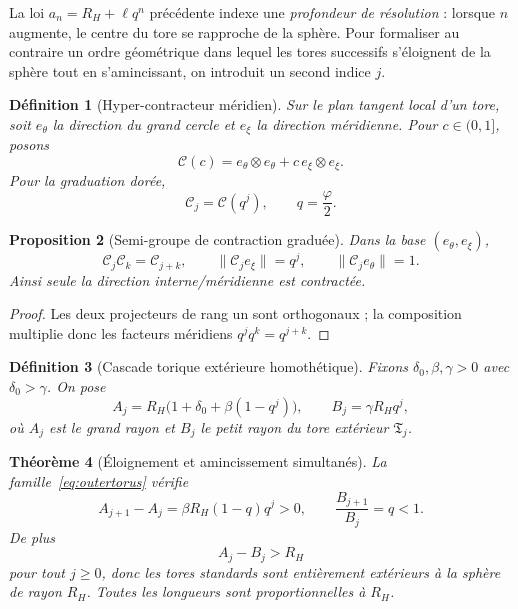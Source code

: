 \documentclass[11pt,a4paper]{article}
\newtheorem{theorem}{Théorème}[section]
\newtheorem{proposition}[theorem]{Proposition}
\newtheorem{definition}[theorem]{Définition}
\newcommand{\ph}{\varphi}
\begin{document}
La loi $a_n=R_H+\ell q^n$ précédente indexe une \emph{profondeur de résolution} : lorsque $n$ augmente, le centre du tore se rapproche de la sphère. Pour formaliser au contraire un ordre géométrique dans lequel les tores successifs s'éloignent de la sphère tout en s'amincissant, on introduit un second indice $j$.

\begin{definition}[Hyper-contracteur méridien]
Sur le plan tangent local d'un tore, soit $e_\theta$ la direction du grand cercle et $e_\xi$ la direction méridienne. Pour $c\in(0,1]$, posons
\[
 \mathcal C(c)=e_\theta\otimes e_\theta+c\,e_\xi\otimes e_\xi.
\]
Pour la graduation dorée,
\begin{equation}\label{eq:Cj}
 \mathcal C_j=\mathcal C(q^j),\qquad q=\frac\ph2.
\end{equation}
\end{definition}

\begin{proposition}[Semi-groupe de contraction graduée]\label{prop:C-semigroup}
Dans la base $(e_\theta,e_\xi)$,
\[
 \mathcal C_j\mathcal C_k=\mathcal C_{j+k},
 \qquad
 \|\mathcal C_j e_\xi\|=q^j,
 \qquad
 \|\mathcal C_j e_\theta\|=1.
\]
Ainsi seule la direction interne/méridienne est contractée.
\end{proposition}

\begin{proof}
Les deux projecteurs de rang un sont orthogonaux ; la composition multiplie donc les facteurs méridiens $q^jq^k=q^{j+k}$.
\end{proof}

\begin{definition}[Cascade torique extérieure homothétique]\label{def:outer-tori}
Fixons $\delta_0,\beta,\gamma>0$ avec $\delta_0>\gamma$. On pose
\begin{equation}\label{eq:outertorus}
 A_j=R_H\bigl(1+\delta_0+\beta(1-q^j)\bigr),
 \qquad
 B_j=\gamma R_Hq^j,
\end{equation}
où $A_j$ est le grand rayon et $B_j$ le petit rayon du tore extérieur $\mathfrak T_j$.
\end{definition}

\begin{theorem}[Éloignement et amincissement simultanés]\label{thm:outercontract}
La famille~\eqref{eq:outertorus} vérifie
\[
 A_{j+1}-A_j=\beta R_H(1-q)q^j>0,
 \qquad
 \frac{B_{j+1}}{B_j}=q<1.
\]
De plus
\[
 A_j-B_j>R_H
\]
pour tout $j\ge0$, donc les tores standards sont entièrement extérieurs à la sphère de rayon $R_H$. Toutes les longueurs sont proportionnelles à $R_H$.
\end{theorem}
\end{document}
